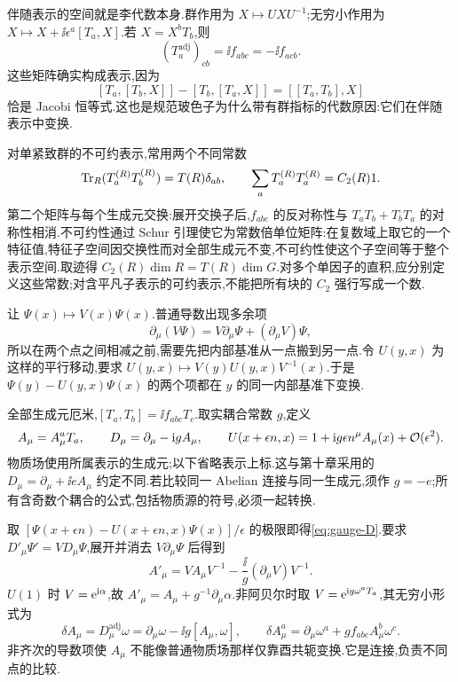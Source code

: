 伴随表示的空间就是李代数本身.群作用为 $X\mapsto UXU^{-1}$;无穷小作用为 $X\mapsto X+\ii\epsilon^a[T_a,X]$.若 $X=X^bT_b$,则
\[
 (T_a^{\mathrm{adj}})_{cb}=\ii f_{abc}=-\ii f_{acb}.
\]
这些矩阵确实构成表示,因为
\[
 [T_a,[T_b,X]]-[T_b,[T_a,X]]=[[T_a,T_b],X]
\]
恰是 Jacobi 恒等式.这也是规范玻色子为什么带有群指标的代数原因:它们在伴随表示中变换.

对单紧致群的不可约表示,常用两个不同常数
\[
 \operatorname{Tr}_R(T_a^{(R)}T_b^{(R)})=T(R)\delta_{ab},\qquad
 \sum_aT_a^{(R)}T_a^{(R)}=C_2(R)1.
\]
第二个矩阵与每个生成元交换:展开交换子后,$f_{abc}$ 的反对称性与 $T_aT_b+T_bT_a$ 的对称性相消.不可约性通过 Schur 引理使它为常数倍单位矩阵:在复数域上取它的一个特征值,特征子空间因交换性而对全部生成元不变,不可约性使这个子空间等于整个表示空间.取迹得 $C_2(R)\dim R=T(R)\dim G$.对多个单因子的直积,应分别定义这些常数;对含平凡子表示的可约表示,不能把所有块的 $C_2$ 强行写成一个数.

让 $\Psi(x)\mapsto V(x)\Psi(x)$.普通导数出现多余项
\[
 \partial_\mu(V\Psi)=V\partial_\mu\Psi+(\partial_\mu V)\Psi,
\]
所以在两个点之间相减之前,需要先把内部基准从一点搬到另一点.令 $U(y,x)$ 为这样的平行移动,要求
$U(y,x)\mapsto V(y)U(y,x)V^{-1}(x)$.于是 $\Psi(y)-U(y,x)\Psi(x)$ 的两个项都在 $y$ 的同一内部基准下变换.

\begin{definition}[本章的规范约定]\label{def:gauge-convention}
全部生成元厄米,$[T_a,T_b]=\ii f_{abc}T_c$.取实耦合常数 $g$,定义
\begin{equation}\label{eq:gauge-D}
 A_\mu=A_\mu^aT_a,\qquad D_\mu=\partial_\mu-\mathrm i gA_\mu,
 \qquad U(x+\epsilon n,x)=1+\mathrm i g\epsilon n^\mu A_\mu(x)+\mathcal O(\epsilon^2).
\end{equation}
物质场使用所属表示的生成元;以下省略表示上标.这与第十章采用的 $D_\mu=\partial_\mu+\ii eA_\mu$ 约定不同.若比较同一 Abelian 连接与同一生成元,须作 $g=-e$;所有含奇数个耦合的公式,包括物质源的符号,必须一起转换.
\end{definition}

取 $[\Psi(x+\epsilon n)-U(x+\epsilon n,x)\Psi(x)]/\epsilon$ 的极限即得\eqref{eq:gauge-D}.要求 $D'_\mu\Psi'=VD_\mu\Psi$,展开并消去 $V\partial_\mu\Psi$ 后得到
\begin{equation}\label{eq:gauge-A-transform}
 A'_\mu=VA_\mu V^{-1}-\frac{\ii}{g}(\partial_\mu V)V^{-1}.
\end{equation}
$U(1)$ 时 $V=\mathrm e^{\mathrm i\alpha}$,故 $A'_\mu=A_\mu+g^{-1}\partial_\mu\alpha$.非阿贝尔时取 $V=\mathrm e^{\mathrm i g\omega^aT_a}$,其无穷小形式为
\begin{equation}\label{eq:inf-gauge}
 \delta A_\mu=D_\mu^{\mathrm{adj}}\omega
 =\partial_\mu\omega-\ii g[A_\mu,\omega],\qquad
 \delta A_\mu^a=\partial_\mu\omega^a+gf_{abc}A_\mu^b\omega^c.
\end{equation}
非齐次的导数项使 $A_\mu$ 不能像普通物质场那样仅靠酉共轭变换.它是连接,负责不同点的比较.


